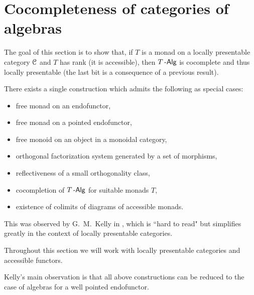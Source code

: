 \documentclass[a4paper,11pt,oneside,openany]{scrbook}
\begin{document}
\section{Cocompleteness of categories of algebras}
The goal of this section is to show that, if $T$ is a monad on a locally presentable category $\operatorname{\mathcal{C}}$ and $T$ has rank (it is accessible), then $T\operatorname{-\mathsf{Alg}}$ is cocomplete and thus locally presentable (the last bit is a consequence of a previous result).

There exists a single construction which admits the following as special cases:
\begin{itemize}
	\item free monad on an endofunctor,
	\item free monad on a pointed endofunctor,
	\item free monoid on an object in a monoidal category,
	\item orthogonal factorization system generated by a set of morphisms,
	\item reflectiveness of a small orthogonality class,
	\item cocompletion of $T\operatorname{-\mathsf{Alg}}$ for suitable monads $T$,
	\item existence of colimits of diagrams of accessible monads.
\end{itemize}
This was observed by G.\ M.\ Kelly in \cite{kelly1980unified}, which is ``hard to read" but simplifies greatly in the context of locally presentable categories.

Throughout this section we will work with locally presentable categories and accessible functors.

Kelly's main observation is that all above constructions can be reduced to the case of algebras for a well pointed endofunctor.
\end{document}
